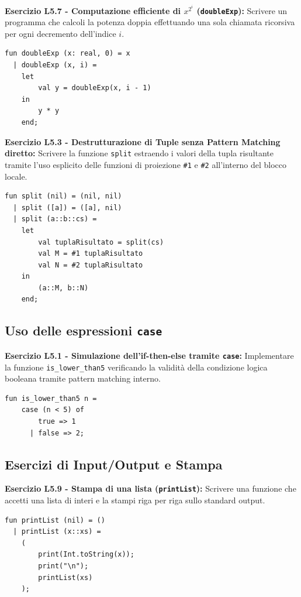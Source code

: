 \documentclass[12pt, a4paper]{article}
\begin{document}
\newpage

\textbf{Esercizio L5.7 - Computazione efficiente di $x^{2^i}$ (\texttt{doubleExp}):}
Scrivere un programma che calcoli la potenza doppia effettuando una sola chiamata ricorsiva per ogni decremento dell'indice $i$.
\begin{verbatim}
fun doubleExp (x: real, 0) = x
  | doubleExp (x, i) =
    let
        val y = doubleExp(x, i - 1)
    in
        y * y
    end;
\end{verbatim}

\textbf{Esercizio L5.3 - Destrutturazione di Tuple senza Pattern Matching diretto:}
Scrivere la funzione \texttt{split} estraendo i valori della tupla risultante tramite l'uso esplicito delle funzioni di proiezione \texttt{\#1} e \texttt{\#2} all'interno del blocco locale.
\begin{verbatim}
fun split (nil) = (nil, nil)
  | split ([a]) = ([a], nil)
  | split (a::b::cs) =
    let
        val tuplaRisultato = split(cs)
        val M = #1 tuplaRisultato
        val N = #2 tuplaRisultato
    in
        (a::M, b::N)
    end;
\end{verbatim}

\subsection{Uso delle espressioni \texttt{case}}

\textbf{Esercizio L5.1 - Simulazione dell'if-then-else tramite \texttt{case}:}
Implementare la funzione \texttt{is\_lower\_than5} verificando la validità della condizione logica booleana tramite pattern matching interno.
\begin{verbatim}
fun is_lower_than5 n =
    case (n < 5) of
        true => 1
      | false => 2;
\end{verbatim}

\subsection{Esercizi di Input/Output e Stampa}

\textbf{Esercizio L5.9 - Stampa di una lista (\texttt{printList}):}
Scrivere una funzione che accetti una lista di interi e la stampi riga per riga sullo standard output.
\begin{verbatim}
fun printList (nil) = ()
  | printList (x::xs) =
    (
        print(Int.toString(x));
        print("\n");
        printList(xs)
    );
\end{verbatim}
\end{document}

